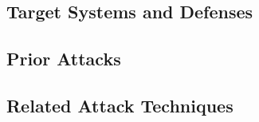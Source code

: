 \placeholder

\subsection{Target Systems and Defenses}
\placeholder

\subsection{Prior Attacks}
\placeholder

\subsection{Related Attack Techniques}
\placeholder